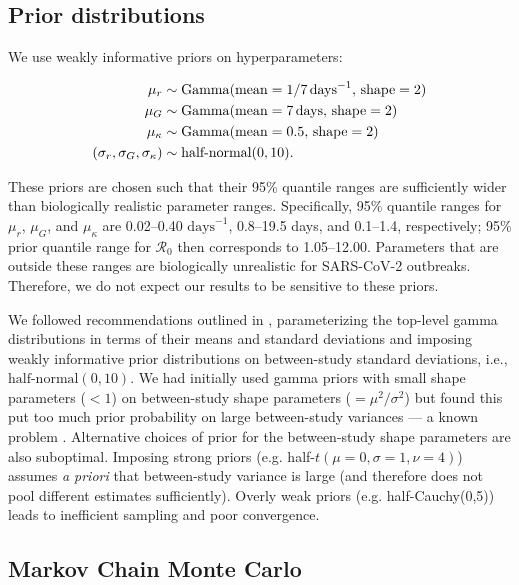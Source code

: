 \documentclass[12pt]{article}
\newcommand{\Ro}{\ensuremath{{\mathcal R}_{0}}\xspace}
\begin{document}
\subsection{Prior distributions}

We use weakly informative priors on hyperparameters:
\begin{linenomath*}
\begin{equation}
\begin{aligned}
\mu_r &\sim \mathrm{Gamma}(\mathrm{mean}=1/7\,\mathrm{days}^{-1},\,\mathrm{shape}=2)\\
\mu_G &\sim \mathrm{Gamma}(\mathrm{mean}=7\,\mathrm{days},\,\mathrm{shape}=2)\\
\mu_\kappa &\sim \mathrm{Gamma}(\mathrm{mean}=0.5,\,\mathrm{shape}=2)\\
(\sigma_r, \sigma_G, \sigma_\kappa) &\sim \textrm{half-normal}(0, 10).
\end{aligned}
\end{equation}
\end{linenomath*}
These priors are chosen such that their 95\% quantile ranges are sufficiently wider than biologically realistic parameter ranges.
Specifically, 95\% quantile ranges for $\mu_r$, $\mu_G$, and $\mu_\kappa$ are 0.02--0.40 $\mathrm{days}^{-1}$, 0.8--19.5 days, and 0.1--1.4, respectively;
95\% prior quantile range for \Ro then corresponds to 1.05--12.00.
Parameters that are outside these ranges are biologically unrealistic for SARS-CoV-2 outbreaks.
Therefore, we do not expect our results to be sensitive to these priors.

We followed recommendations outlined in \cite{gelman2006prior}, parameterizing the top-level gamma distributions in terms of their means and standard deviations and imposing weakly informative prior distributions on between-study standard deviations, i.e., $\textrm{half-normal}(0, 10)$.
We had initially used gamma priors with small shape parameters ($< 1$) on between-study shape parameters ($=\mu^2/\sigma^2$) but found this put too much prior probability on large between-study variances --- a known problem \citep{gelman2006prior}.
Alternative choices of prior for the between-study shape parameters are also suboptimal. 
Imposing strong priors (e.g. half-$t(\mu=0,\sigma=1,\nu=4)$) assumes \textit{a priori} that between-study variance is large (and therefore does not pool different estimates sufficiently).
Overly weak priors (e.g. half-Cauchy(0,5)) leads to inefficient sampling and poor convergence.

\subsection{Markov Chain Monte Carlo}
\end{document}
